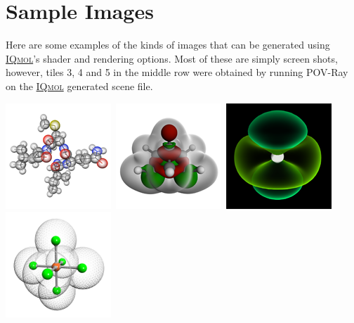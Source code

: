 \documentclass[a4paper,12pt]{article}
\newcommand{\iqmol}{\href{http://iqmol.org}{{\scshape IQmol}}}
\begin{document}
\newpage
\section{Sample Images}

Here are some examples of the kinds of images that can be generated using
\iqmol{}'s shader and rendering options.  Most of these are simply screen
shots, however, tiles 3, 4 and 5 in the middle row were obtained by 
running POV-Ray on the \iqmol{} generated scene file.

\begin{center}
\includegraphics[scale=0.58]{figures/gallery/g13_sm.png}\
\includegraphics[scale=0.58]{figures/gallery/g14_sm.png}\
\includegraphics[scale=0.58]{figures/gallery/g15_sm.png}\
\includegraphics[scale=0.58]{figures/gallery/g16_sm.png}\

\end{center}
\end{document}
